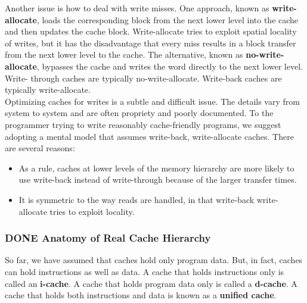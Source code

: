 \documentclass[11pt]{article}
\begin{document}
Another issue is how to deal with write misses. One approach, known as \textbf{write-allocate}, loads the corresponding block from the next lower level into the cache and then updates the cache block. Write-allocate tries to exploit spatial locality of writes, but it has the disadvantage that every miss results in a block transfer from the next lower level to the cache. The alternative, known as \textbf{no-write-allocate}, bypasses the cache and writes the word directly to the next lower level. Write- through caches are typically no-write-allocate. Write-back caches are typically write-allocate.\\


Optimizing caches for writes is a subtle and difficult issue. The details vary from system to system and are often propriety and poorly documented. To the programmer trying to write reasonably cache-friendly programs, we suggest adopting a mental model that assumes write-back, write-allocate caches. There are several reasons:\\
\begin{itemize}
\item As a rule, caches at lower levels of the memory hierarchy are more likely to use write-back instead of write-through because of the larger transfer times.\\
\item It is symmetric to the way reads are handled, in that write-back write-allocate tries to exploit locality.\\
\end{itemize}


\subsubsection{{\bfseries\sffamily DONE} Anatomy of Real Cache Hierarchy}
\label{sec:orgffe9406}
So far, we have assumed that caches hold only program data. But, in fact, caches can hold instructions as well as data. A cache that holds instructions only is called an \textbf{i-cache}. A cache that holds program data only is called a \textbf{d-cache}. A cache that holds both instructions and data is known as a \textbf{unified cache}.\\
\end{document}

